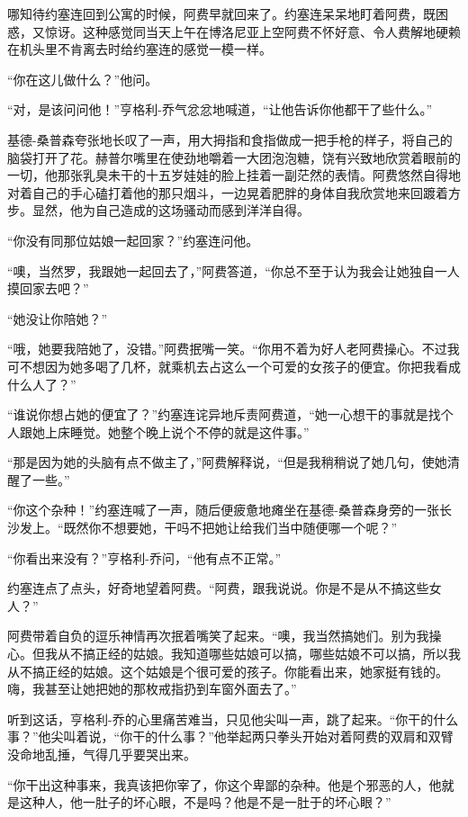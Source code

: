  


    哪知待约塞连回到公寓的时候，阿费早就回来了。约塞连呆呆地盯着阿费，既困惑，又惊讶。这种感觉同当天上午在博洛尼亚上空阿费不怀好意、令人费解地硬赖在机头里不肯离去时给约塞连的感觉一模一样。

    “你在这儿做什么？”他问。

    “对，是该问问他！”亨格利-乔气忿忿地喊道，“让他告诉你他都干了些什么。”

    基德-桑普森夸张地长叹了一声，用大拇指和食指做成一把手枪的样子，将自己的脑袋打开了花。赫普尔嘴里在使劲地嚼着一大团泡泡糖，饶有兴致地欣赏着眼前的一切，他那张乳臭未干的十五岁娃娃的脸上挂着一副茫然的表情。阿费悠然自得地对着自己的手心磕打着他的那只烟斗，一边晃着肥胖的身体自我欣赏地来回踱着方步。显然，他为自己造成的这场骚动而感到洋洋自得。

    “你没有同那位姑娘一起回家？”约塞连问他。

    “噢，当然罗，我跟她一起回去了，”阿费答道，“你总不至于认为我会让她独自一人摸回家去吧？”

    “她没让你陪她？”

    “哦，她要我陪她了，没错。”阿费抿嘴一笑。“你用不着为好人老阿费操心。不过我可不想因为她多喝了几杯，就乘机去占这么一个可爱的女孩子的便宜。你把我看成什么人了？”

    “谁说你想占她的便宜了？”约塞连诧异地斥责阿费道，“她一心想干的事就是找个人跟她上床睡觉。她整个晚上说个不停的就是这件事。”

    “那是因为她的头脑有点不做主了，”阿费解释说，“但是我稍稍说了她几句，使她清醒了一些。”

    “你这个杂种！”约塞连喊了一声，随后便疲惫地瘫坐在基德-桑普森身旁的一张长沙发上。“既然你不想要她，干吗不把她让给我们当中随便哪一个呢？”

    “你看出来没有？”亨格利-乔问，“他有点不正常。”

    约塞连点了点头，好奇地望着阿费。“阿费，跟我说说。你是不是从不搞这些女人？”

    阿费带着自负的逗乐神情再次抿着嘴笑了起来。“噢，我当然搞她们。别为我操心。但我从不搞正经的姑娘。我知道哪些姑娘可以搞，哪些姑娘不可以搞，所以我从不搞正经的姑娘。这个姑娘是个很可爱的孩子。你能看出来，她家挺有钱的。嗨，我甚至让她把她的那枚戒指扔到车窗外面去了。”

    听到这话，亨格利-乔的心里痛苦难当，只见他尖叫一声，跳了起来。“你干的什么事？”他尖叫着说，“你干的什么事？”他举起两只拳头开始对着阿费的双肩和双臂没命地乱捶，气得几乎要哭出来。
 


    “你干出这种事来，我真该把你宰了，你这个卑鄙的杂种。他是个邪恶的人，他就是这种人，他一肚子的坏心眼，不是吗？他是不是一肚于的坏心眼？”

